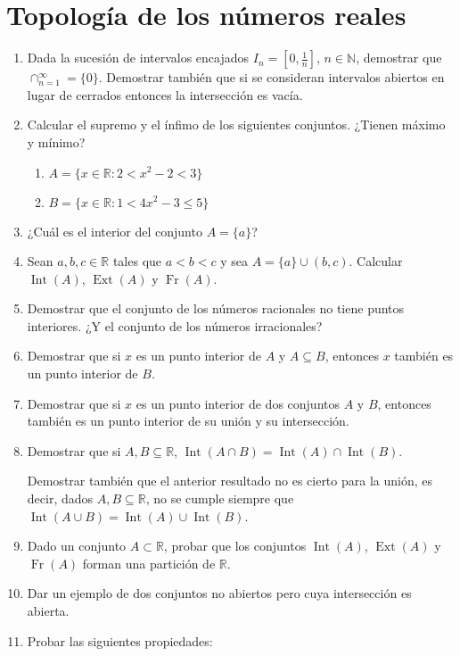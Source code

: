 \documentclass[
  letterpaper,
  DIV=11,
  numbers=noendperiod]{scrreport}
\providecommand{\tightlist}{%
  \setlength{\itemsep}{0pt}\setlength{\parskip}{0pt}}\usepackage{longtable,booktabs,array}
\theoremstyle{definition}
\theoremstyle{remark}
\begin{document}

\hypertarget{topologuxeda-de-los-nuxfameros-reales}{%
\chapter{Topología de los números
reales}\label{topologuxeda-de-los-nuxfameros-reales}}

\begin{enumerate}
\def\labelenumi{\arabic{enumi}.}
\item
  Dada la sucesión de intervalos encajados \(I_n=[0,\frac{1}{n}]\),
  \(n\in\mathbb{N}\), demostrar que \(\cap_{n=1}^\infty = \{0\}\).
  Demostrar también que si se consideran intervalos abiertos en lugar de
  cerrados entonces la intersección es vacía.
\item
  Calcular el supremo y el ínfimo de los siguientes conjuntos. ¿Tienen
  máximo y mínimo?

  \begin{enumerate}
  \def\labelenumii{\alph{enumii}.}
  \tightlist
  \item
    \(A=\{x\in \mathbb{R} : 2 < x^2-2 < 3\}\)
  \item
    \(B=\{x\in \mathbb{R} : 1 < 4x^2 - 3 \leq 5\}\)
  \end{enumerate}
\item
  ¿Cuál es el interior del conjunto \(A=\{a\}\)?
\item
  Sean \(a,b,c\in\mathbb{R}\) tales que \(a<b<c\) y sea
  \(A=\{a\}\cup (b,c)\). Calcular \(\operatorname{Int}(A)\),
  \(\operatorname{Ext}(A)\) y \(\operatorname{Fr}(A)\).
\item
  Demostrar que el conjunto de los números racionales no tiene puntos
  interiores. ¿Y el conjunto de los números irracionales?
\item
  Demostrar que si \(x\) es un punto interior de \(A\) y
  \(A\subseteq B\), entonces \(x\) también es un punto interior de
  \(B\).
\item
  Demostrar que si \(x\) es un punto interior de dos conjuntos \(A\) y
  \(B\), entonces también es un punto interior de su unión y su
  intersección.
\item
  Demostrar que si \(A,B\subseteq \mathbb{R}\),
  \(\operatorname{Int}(A\cap B) = \operatorname{Int}(A) \cap \operatorname{Int}(B)\).

  Demostrar también que el anterior resultado no es cierto para la
  unión, es decir, dados \(A,B\subseteq \mathbb{R}\), no se cumple
  siempre que
  \(\operatorname{Int}(A\cup B) = \operatorname{Int}(A) \cup \operatorname{Int}(B)\).
\item
  Dado un conjunto \(A\subset\mathbb{R}\), probar que los conjuntos
  \(\operatorname{Int}(A)\), \(\operatorname{Ext}(A)\) y
  \(\operatorname{Fr}(A)\) forman una partición de \(\mathbb{R}\).
\item
  Dar un ejemplo de dos conjuntos no abiertos pero cuya intersección es
  abierta.
\item
  Probar las siguientes propiedades:


\end{enumerate}
\end{document}
